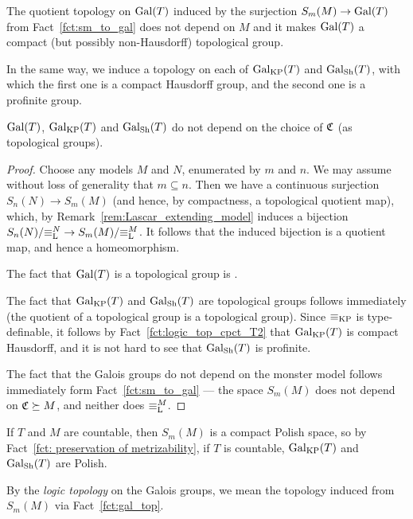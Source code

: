 	
	\begin{fct}
		\label{fct:gal_top}
		The quotient topology on $\operatorname{{Gal}}(T)$ induced by the surjection $S_m(M)\to \operatorname{{Gal}}(T)$ from Fact~\ref{fct:sm_to_gal} does not depend on $M$ and it makes $\operatorname{{Gal}}(T)$ a compact (but possibly non-Hausdorff) topological group.
		
		In the same way, we induce a topology on each of $\operatorname{{Gal}}_{\mathrm{KP}}(T)$ and $\operatorname{{Gal}}_{\mathrm{Sh}}(T)$, with which the first one is a compact Hausdorff group, and the second one is a profinite group.
		
		$\operatorname{{Gal}}(T)$, $\operatorname{{Gal}}_{\mathrm{KP}}(T)$ and $\operatorname{{Gal}}_{\mathrm{Sh}}(T)$ do not depend on the choice of ${\mathfrak C}$ (as topological groups).
	\end{fct}
	\begin{proof}
		Choose any models $M$ and $N$, enumerated by $m$ and $n$. We may assume without loss of generality that $m\subseteq n$. Then we have a continuous surjection $S_n(N)\to S_m(M)$ (and hence, by compactness, a topological quotient map), which, by Remark~\ref{rem:Lascar_extending_model} induces a bijection $S_n(N)/{\equiv_{\mathrm{L}}^N}\to S_m(M)/{\equiv_{\mathrm{L}}^M}$. It follows that the induced bijection is a quotient map, and hence a homeomorphism.
		
		The fact that $\operatorname{{Gal}}(T)$ is a topological group is \cite[Lemma 18]{Zie02}.
		
		The fact that $\operatorname{{Gal}}_{\mathrm{KP}}(T)$ and $\operatorname{{Gal}}_{\mathrm{Sh}}(T)$ are topological groups follows immediately (the quotient of a topological group is a topological group). Since $\equiv_{\mathrm{KP}}$ is type-definable, it follows by Fact~\ref{fct:logic_top_cpct_T2} that $\operatorname{{Gal}}_{\mathrm{KP}}(T)$ is compact Hausdorff, and it is not hard to see that $\operatorname{{Gal}}_{\mathrm{Sh}}(T)$ is profinite.
		
		The fact that the Galois groups do not depend on the monster model follows immediately form Fact~\ref{fct:sm_to_gal} --- the space $S_m(M)$ does not depend on ${\mathfrak C}\succeq M$, and neither does $\equiv_{\mathrm{L}}^M$.
	\end{proof}
	
	
	\begin{rem}\label{rem: GalKP is Polish}
		If $T$ and $M$ are countable, then $S_m(M)$ is a compact Polish space, so by Fact~\ref{fct: preservation of metrizability}, if $T$ is countable, $\operatorname{{Gal}}_{\mathrm{KP}}(T)$ and $\operatorname{{Gal}}_{\mathrm{Sh}}(T)$ are Polish.\xqed{\lozenge}
	\end{rem}
	
	\begin{dfn}
		By the \emph{logic topology} on the Galois groups, we mean the topology induced from $S_m(M)$ via Fact~\ref{fct:gal_top}.\xqed{\lozenge}
	\end{dfn}
	
